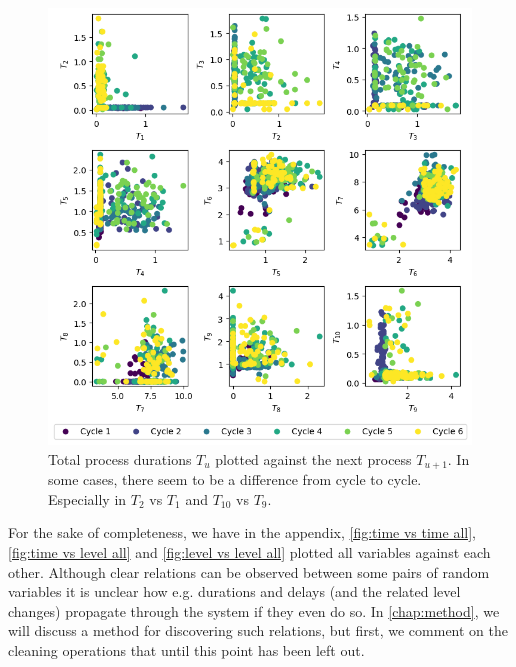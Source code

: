 \documentclass[../Thesis.tex]{subfiles}
\begin{document}
\begin{figure}[H]
    \centering
    \includegraphics[width=\linewidth]{figures/Multiple cycles data/phase scatter vs next phase.png}
    \caption{Total process durations $T_u$ plotted against the next process $T_{u+1}$. In some cases, there seem to be a difference from cycle to cycle. Especially in $T_2$ vs $T_1$ and $T_{10}$ vs $T_9$.}
    \label{fig:Data - process and the next process scatter}
\end{figure}

For the sake of completeness, we have in the appendix, \autoref{fig:time vs time all}, \autoref{fig:time vs level all} and \autoref{fig:level vs level all} plotted all variables against each other. Although clear relations can be observed between some pairs of random variables it is unclear how e.g. durations and delays (and the related level changes) propagate through the system if they even do so. In \autoref{chap:method}, we will discuss a method for discovering such relations, but first, we comment on the cleaning operations that until this point has been left out.



\end{document}
